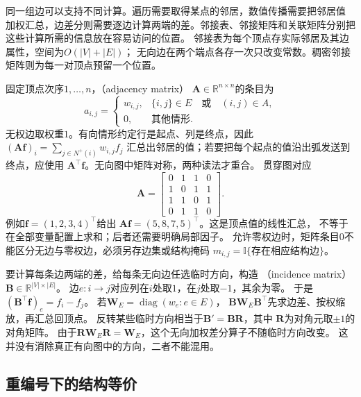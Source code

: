 同一组边可以支持不同计算。遍历需要取得某点的邻居，数值传播需要把邻居值
加权汇总，边差分则需要逐边计算两端的差。邻接表、邻接矩阵和关联矩阵分别把
这些计算所需的信息放在容易访问的位置。
邻接表为每个顶点存实际邻居及其边属性，空间为\(O(|V|+|E|)\)；
无向边在两个端点各存一次只改变常数。稠密邻接矩阵则为每一对顶点预留一个位置。

固定顶点次序\(1,\ldots,n\)，（adjacency matrix）
\(\bm A\in\mathbb R^{n\times n}\)的条目为
\[
  a_{i,j}=
  \begin{cases}
    w_{i,j},&\{i,j\}\in E\quad\text{或}\quad(i,j)\in A,\\
    0,&\text{其他情形}.
  \end{cases}
\]
无权边取权重\(1\)。有向情形约定行是起点、列是终点，因此
\((\bm A\bm f)_i=\sum_{j\in N^+(i)}w_{i,j}f_j\)
汇总出邻居的值；若要把每个起点的值沿出弧发送到终点，应使用
\(\bm A^\top\bm f\)。无向图中矩阵对称，两种读法才重合。
贯穿图对应
\begin{equation}
  \bm A=
  \begin{bmatrix}
    0&1&1&0\\
    1&0&1&1\\
    1&1&0&1\\
    0&1&1&0
  \end{bmatrix}.
  \label{eq:graph-theory-running-adjacency}
\end{equation}
例如\(\bm f=(1,2,3,4)^\top\)给出
\(\bm A\bm f=(5,8,7,5)^\top\)。这是顶点值的线性汇总，
不等于在全部变量配置上求和；后者还需要明确局部因子。
允许零权边时，矩阵条目\(0\)不能区分无边与零权边，必须另存边集或结构掩码
\(m_{i,j}=\mathbb I\{\text{存在相应结构边}\}\)。

要计算每条边两端的差，给每条无向边任选临时方向，构造
（incidence matrix）
\(\bm B\in\mathbb R^{|V|\times|E|}\)。
边\(e:i\to j\)对应列在\(i\)处取\(1\)，在\(j\)处取\(-1\)，其余为零。
于是\((\bm B^\top\bm f)_e=f_i-f_j\)。
若\(\bm W_E=\operatorname{diag}(w_e:e\in E)\)，
\(\bm B\bm W_E\bm B^\top\)先求边差、按权缩放，再汇总回顶点。
反转某些临时方向相当于\(\bm B'=\bm B\bm R\)，其中
\(\bm R\)为对角元取\(\pm1\)的对角矩阵。
由于\(\bm R\bm W_E\bm R=\bm W_E\)，这个无向加权差分算子不随临时方向改变。
这并没有消除真正有向图中的方向，二者不能混用。

\subsection{重编号下的结构等价}
\label{sec:graph-theory-graph-isomorphism}

